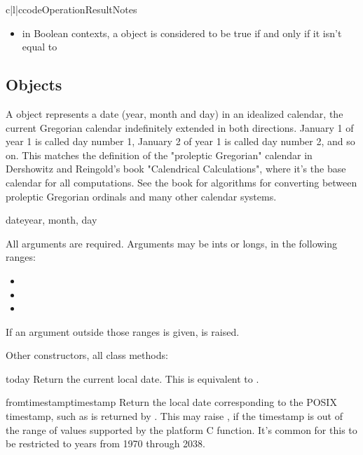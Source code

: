 \begin{tableiii}{c|l|c}{code}{Operation}{Result}{Notes}
\begin{itemize}
  \item
    in Boolean contexts, a  object is considered to be true
    if and only if it isn't equal to 
\end{itemize}


\subsection{ Objects \label{datetime-date}}

A  object represents a date (year, month and day) in an idealized
calendar, the current Gregorian calendar indefinitely extended in both
directions.  January 1 of year 1 is called day number 1, January 2 of year
1 is called day number 2, and so on.  This matches the definition of the
"proleptic Gregorian" calendar in Dershowitz and Reingold's book
"Calendrical Calculations", where it's the base calendar for all
computations.  See the book for algorithms for converting between
proleptic Gregorian ordinals and many other calendar systems.

\begin{funcdesc}{date}{year, month, day}

    All arguments are required.  Arguments may be ints or longs, in the
    following ranges:

\begin{itemize}
  \item {}
  \item {}
  \item {}
\end{itemize}

If an argument outside those ranges is given, 
is raised.
\end{funcdesc}

Other constructors, all class methods:

\begin{methoddesc}{today}{}
    Return the current local date.  This is equivalent to
    .
\end{methoddesc}

\begin{methoddesc}{fromtimestamp}{timestamp}
    Return the local date corresponding to the POSIX timestamp, such
    as is returned by .  This may raise
    , if the timestamp is out of the range of
    values supported by the platform C 
    function.  It's common for this to be restricted to years from 1970
    through 2038.
\end{methoddesc}


\end{tableiii}
